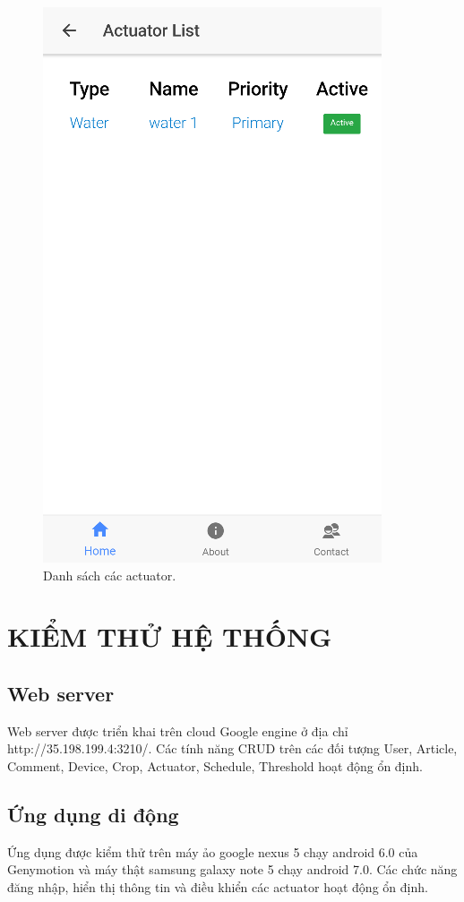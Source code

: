 \documentclass[a4paper,12pt,oneside]{article}
\begin{document}
\begin{figure}[H]
\centering
\includegraphics[scale=.7]{hinh/mobile_actuator_list.png}
\caption{Danh sách các actuator.}
\end{figure}

\newpage
\section{KIỂM THỬ HỆ THỐNG}
\subsection{Web server}
\noindent Web server được triển khai trên cloud Google engine ở địa chỉ http://35.198.199.4:3210/. Các tính năng CRUD trên các đối tượng User, Article, Comment, Device, Crop, Actuator, Schedule, Threshold hoạt động ổn định. 
\subsection{Ứng dụng di động}
\noindent Ứng dụng được kiểm thử trên máy ảo google nexus 5 chạy android 6.0 của Genymotion và máy thật samsung galaxy note 5 chạy android 7.0. Các chức năng đăng nhập, hiển thị thông tin và điều khiển các actuator hoạt động ổn định.
\end{document}
